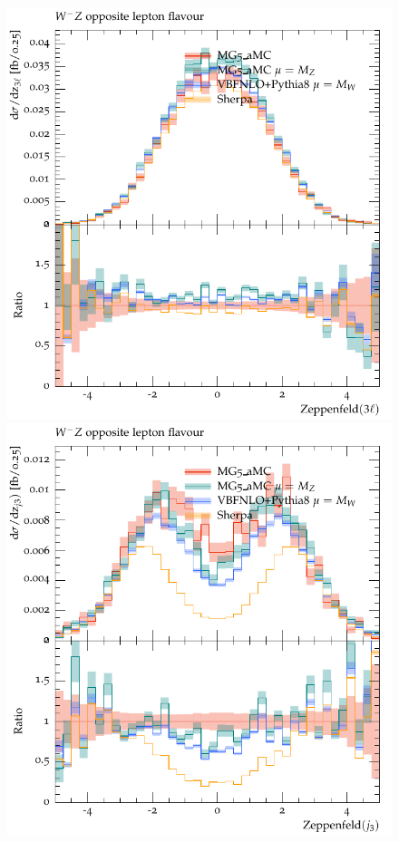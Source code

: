 \documentclass[11pt]{cernrep}
\begin{document}
\begin{figure}[htbp]
\begin{center}
   \includegraphics[scale=0.5]{figs/WmZ_OF_zep3l}
   \includegraphics[scale=0.5]{figs/WmZ_OF_zepj3}

\end{center}
\end{figure}
\end{document}
